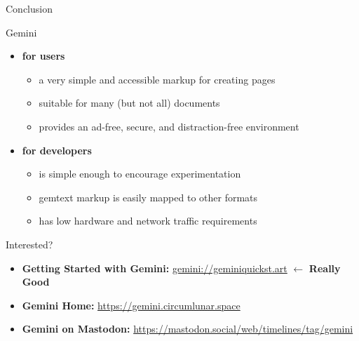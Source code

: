\documentclass[presentation, 11pt,  aspectratio=169]{beamer}
\renewcommand{\alert}[1]{\textbf{\textcolor{mydarkred}{#1}}}
\begin{document}
\begin{frame}[label={sec:orge1ad6cc}]{Conclusion}
\begin{block}{Gemini}
\begin{itemize}
\item \alert{for users}\\
\begin{itemize}
\item a very simple and accessible markup for creating pages\\
\item suitable for many (but not all) documents\\
\item provides an ad-free, secure, and distraction-free environment\\
\end{itemize}

\item \alert{for developers}\\
\begin{itemize}
\item is simple enough to encourage experimentation\\
\item gemtext markup is easily mapped to other formats\\
\item has low hardware and network traffic requirements\\
\end{itemize}
\end{itemize}
\pause
\end{block}
\begin{block}{Interested?}
\begin{itemize}
\item \alert{Getting Started with Gemini:} \href{gemini://geminiquickst.art}{gemini://geminiquickst.art} \(\leftarrow\) \alert{Really Good}\\
\item \alert{Gemini Home:} \url{https://gemini.circumlunar.space}\\
\item \alert{Gemini on Mastodon:} \url{https://mastodon.social/web/timelines/tag/gemini}\\
\end{itemize}
\end{block}
\end{frame}
\end{document}
